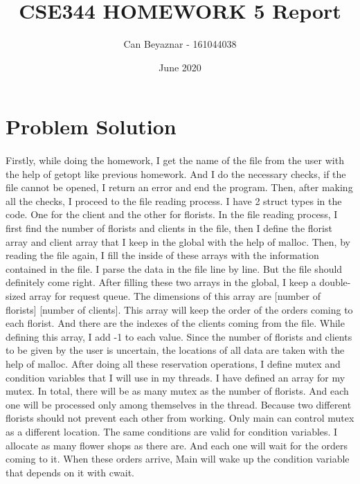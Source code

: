 \documentclass{article}
\title{CSE344 HOMEWORK 5 Report}
\author{Can Beyaznar - 161044038}
\date{June 2020}
\begin{document}
\maketitle

\section{Problem Solution}
\paragraph{}
Firstly, while doing the homework, I get the name of the file from the user with
the help of getopt like previous homework. And I do the necessary checks, if
the file cannot be opened, I return an error and end the program. Then, after
making all the checks, I proceed to the file reading process. I have 2 struct
types in the code. One for the client and the other for florists. In the file reading
process, I first find the number of florists and clients in the file, then I define the
florist array and client array that I keep in the global with the help of malloc. Then, by reading the file again, I fill the inside of these arrays with the
information contained in the file. I parse the data in the file line by line. But the
file should definitely come right. After filling these two arrays in the global, I
keep a double-sized array for request queue. The dimensions of this array are
[number of florists] [number of clients]. This array will keep the order of the
orders coming to each florist. And there are the indexes of the clients coming
from the file. While defining this array, I add -1 to each value. Since the number
of florists and clients to be given by the user is uncertain, the locations of all
data are taken with the help of malloc. After doing all these reservation
operations, I define mutex and condition variables that I will use in my threads.
I have defined an array for my mutex. In total, there will be as many mutex as
the number of florists. And each one will be processed only among themselves
in the thread. Because two different florists should not prevent each other from
working. Only main can control mutex as a different location. The same
conditions are valid for condition variables. I allocate as many flower shops as
there are. And each one will wait for the orders coming to it. When these
orders arrive, Main will wake up the condition variable that depends on it with
cwait.
\mbox{}\\
\end{document}

